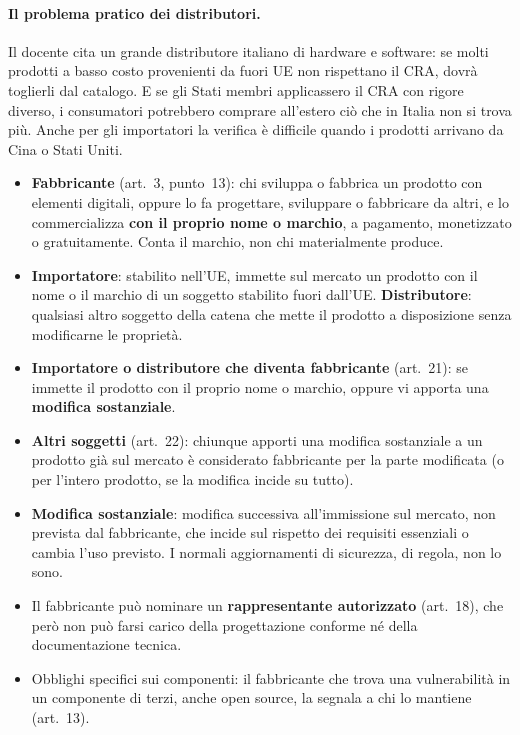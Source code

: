 \paragraph{Il problema pratico dei distributori.} Il docente cita un grande distributore italiano di
hardware e software: se molti prodotti a basso costo provenienti da fuori UE non rispettano il CRA, dovrà
toglierli dal catalogo. E se gli Stati membri applicassero il CRA con rigore diverso, i consumatori
potrebbero comprare all'estero ciò che in Italia non si trova più. Anche per gli importatori la verifica
è difficile quando i prodotti arrivano da Cina o Stati Uniti.

\begin{integrazione}
\begin{itemize}
  \item \textbf{Fabbricante} (art.~3, punto~13): chi sviluppa o fabbrica un prodotto con elementi digitali,
    oppure lo fa progettare, sviluppare o fabbricare da altri, e lo commercializza \textbf{con il proprio
    nome o marchio}, a pagamento, monetizzato o gratuitamente. Conta il marchio, non chi materialmente
    produce.
  \item \textbf{Importatore}: stabilito nell'UE, immette sul mercato un prodotto con il nome o il marchio
    di un soggetto stabilito fuori dall'UE. \textbf{Distributore}: qualsiasi altro soggetto della catena
    che mette il prodotto a disposizione senza modificarne le proprietà.
  \item \textbf{Importatore o distributore che diventa fabbricante} (art.~21): se immette il prodotto con
    il proprio nome o marchio, oppure vi apporta una \textbf{modifica sostanziale}.
  \item \textbf{Altri soggetti} (art.~22): chiunque apporti una modifica sostanziale a un prodotto già sul
    mercato è considerato fabbricante per la parte modificata (o per l'intero prodotto, se la modifica
    incide su tutto).
  \item \textbf{Modifica sostanziale}: modifica successiva all'immissione sul mercato, non prevista dal
    fabbricante, che incide sul rispetto dei requisiti essenziali o cambia l'uso previsto. I normali
    aggiornamenti di sicurezza, di regola, non lo sono.
  \item Il fabbricante può nominare un \textbf{rappresentante autorizzato} (art.~18), che però non può
    farsi carico della progettazione conforme né della documentazione tecnica.
  \item Obblighi specifici sui componenti: il fabbricante che trova una vulnerabilità in un componente
    di terzi, anche open source, la segnala a chi lo mantiene (art.~13).
\end{itemize}
\end{integrazione}

